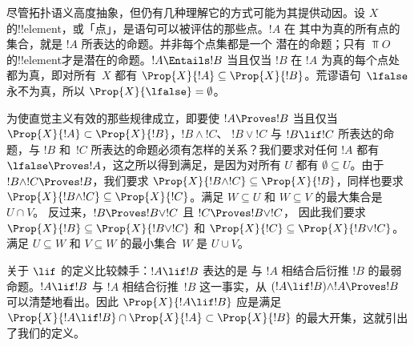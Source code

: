 \documentclass[../../../include/open-logic-section]{subfiles}
\begin{document}
尽管拓扑语义高度抽象，但仍有几种理解它的方式可能为其提供动因。设
$X$ 的!!{element}，或「点」，是语句可以被评估的那些点。$!A$ 在
其中为真的所有点的集合，就是 $!A$ 所表达的命题。并非每个点集都是一个
潜在的命题；只有 $\Top{O}$ 的!!{element}才是潜在的命题。$!A \Entails !B$ 当且仅当 $!B$
在 $!A$ 为真的每个点处都为真，即对所有~$X$ 都有 $\Prop{X}{!A}
\subseteq \Prop{X}{!B}$。荒谬语句~$\lfalse$
永不为真，所以 $\Prop{X}{\lfalse} = \emptyset$。

为使直觉主义有效的那些规律成立，即要使 $!A \Proves
!B$ 当且仅当 $\Prop{X}{!A} \subset \Prop{X}{!B}$，$!B \land !C$、
$!B \lor !C$ 与 $!B \lif !C$ 所表达的命题，与 $!B$ 和~$!C$
所表达的命题必须有怎样的关系？我们要求对任何 $!A$ 都有 $\lfalse
\Proves !A$，这之所以得到满足，是因为对所有 $U$ 都有
$\emptyset \subseteq U$。由于 $!B \land !C \Proves !B$，我们要求
$\Prop{X}{!B \land !C} \subseteq \Prop{X}{!B}$，同样也要求
$\Prop{X}{!B \land !C} \subseteq \Prop{X}{!C}$。满足 $W \subseteq U$
和 $W \subseteq V$ 的最大集合是 $U \cap V$。
反过来，$!B \Proves !B \lor !C$ 且 $!C \Proves !B \lor !C$，
因此我们要求 $\Prop{X}{!B} \subseteq \Prop{X}{!B \lor !C}$ 和
$\Prop{X}{!C} \subseteq \Prop{X}{!B \lor !C}$。满足 $U \subseteq W$
和 $V \subseteq W$ 的最小集合~$W$ 是 $U \cup V$。

关于 $\lif$ 的定义比较棘手：$!A \lif !B$ 表达的是
与 $!A$ 相结合后衍推 $!B$ 的最弱命题。$!A
\lif !B$ 与 $!A$ 相结合衍推~$!B$ 这一事实，从 $(!A \lif !B)
\land !A \Proves !B $ 可以清楚地看出。因此 $\Prop{X}{!A \lif !B}$
应是满足 $\Prop{X}{!A \lif !B} \cap \Prop{X}{!A}
\subset \Prop{X}{!B}$ 的最大开集，这就引出了我们的定义。
\end{document}
